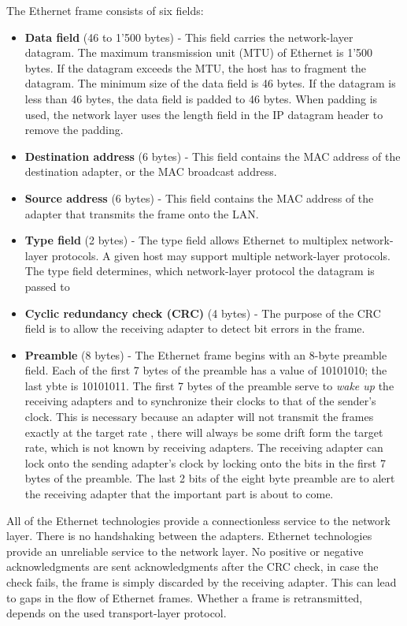 The Ethernet frame consists of six fields:
\begin{itemize}
\item \textbf{Data field} (46 to 1'500 bytes) - This field carries the network-layer datagram. The maximum transmission unit (MTU) of Ethernet is 1'500 bytes. If the datagram exceeds the MTU, the host has to fragment the datagram. The minimum size of the data field is 46 bytes. If the datagram is less than 46 bytes, the data field is padded to 46 bytes. When padding is used, the network layer uses the length field in the IP datagram header to remove the padding.
\item \textbf{Destination address} (6 bytes) - This field contains the MAC address of the destination adapter, or the MAC broadcast address.
\item \textbf{Source address} (6 bytes) - This field contains the MAC address of the adapter that transmits the frame onto the LAN.
\item \textbf{Type field} (2 bytes) - The type field allows Ethernet to multiplex network-layer protocols. A given host may support multiple network-layer protocols. The type field determines, which network-layer protocol the datagram is passed to
\item \textbf{Cyclic redundancy check (CRC)} (4 bytes) - The purpose of the CRC field is to allow the receiving adapter to detect bit errors in the frame.
\item \textbf{Preamble} (8 bytes) - The Ethernet frame begins with an 8-byte preamble field. Each of the first 7 bytes of the preamble has a value of 10101010; the last ybte is 10101011. The first 7 bytes of the preamble serve to \textit{wake up} the receiving adapters and to synchronize their clocks to that of the sender's clock. This is necessary because an adapter will not transmit the frames exactly at the target rate , there will always be some drift form the target rate, which is not known by receiving adapters. The receiving adapter can lock onto the sending adapter's clock by locking onto the bits in the first 7 bytes of the preamble. The last 2 bits of the eight byte preamble are to alert the receiving adapter that the important part is about to come.
\end{itemize}
All of the Ethernet technologies provide a connectionless service to the network layer. There is no handshaking between the adapters. Ethernet technologies provide an unreliable service to the network layer. No positive or negative acknowledgments are sent acknowledgments after the CRC check, in case the check fails, the frame is simply discarded by the receiving adapter. This can lead to gaps in the flow of Ethernet frames. Whether a frame is retransmitted, depends on the used transport-layer protocol.

